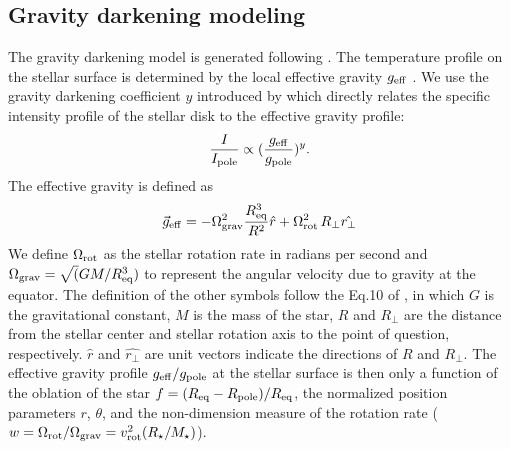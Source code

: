 \documentclass[iop]{emulateapj}
\begin{document}
\subsection{Gravity darkening modeling}
\label{sec:grav-model}
The gravity darkening model is generated following \citet{Barnes:2009}.
The temperature profile on the stellar surface is determined by the local 
effective gravity $g_{\rm eff}$ \citep{Zeipel:1924}. We use the gravity
darkening coefficient $y$ introduced by \citep{Kopal:1959} which 
directly relates the specific intensity profile of the stellar disk to 
the effective gravity profile: 
\begin{equation}
\frac{I}{I_{\rm pole}} \propto (\frac{g_{\rm eff}}{g_{\rm pole}})^{y}. 
\end{equation}
The effective gravity is defined as 
\begin{equation}
\vec{g}_{\rm eff} = -\Omega_{\rm grav}^2\frac{R_{\rm eq}^3}{R^2}\hat{r} \\ 
+ \Omega_{\rm rot}^2\,R_{\perp}\hat{r_{\perp}}
\end{equation}
We define $\Omega_{\rm rot}$ as the stellar rotation rate in radians 
per second and $\Omega_{\rm grav} = \sqrt(GM/R_{\rm eq}^3)$ to represent the angular velocity due to 
gravity at the equator. 
The definition of the other symbols follow the Eq.10 of \citet{Barnes:2009}, in 
which $G$ is the gravitational constant, $M$ is the mass of the star, $R$ 
and $R_{\perp}$ are the distance from the stellar center and stellar 
rotation axis to the point of question, respectively. $\hat{r}$ and 
$\hat{r_{\perp}}$ are unit vectors indicate the directions of $R$ and 
$R_{\perp}$. 
The effective gravity profile $g_{\rm eff}/g_{\rm pole}$ at the
stellar surface is then only a function of the oblation of the star $f=(R_{\rm eq}-R_{\rm pole})/R_{\rm eq}$, 
the normalized position parameters $r$, $\theta$, and the non-dimension measure of the 
rotation rate ($w=\Omega_{\rm rot}/\Omega_{\rm grav}=v_{\rm rot}^2(R_{\star}/M_{\star})$). 
\end{document}
